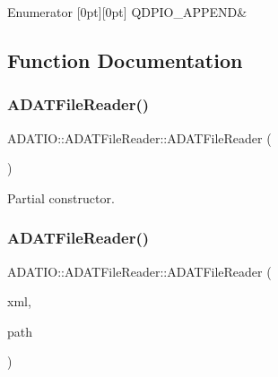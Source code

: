 \begin{DoxyEnumFields}{Enumerator}
[0pt][0pt]{}\mbox{\label{group__qio_gga669520ca9003997be838730beef322b4aae9e16570c37ba9ace5529d3bc48b9a8}} 
Q\+D\+P\+I\+O\+\_\+\+A\+P\+P\+E\+ND&\\
\hline

\end{DoxyEnumFields}


\subsection{Function Documentation}
\mbox{\label{group__qio_ga800c009d1400eb965cc04a7f90bf4f24}} 
\subsubsection{\texorpdfstring{ADATFileReader()}{ADATFileReader()}\hspace{0.1cm}{\footnotesize\ttfamily [1/2]}}
{\footnotesize\ttfamily A\+D\+A\+T\+I\+O\+::\+A\+D\+A\+T\+File\+Reader\+::\+A\+D\+A\+T\+File\+Reader (\begin{DoxyParamCaption}{ }\end{DoxyParamCaption})}



Partial constructor. 

\mbox{\label{group__qio_ga096a7060d69fd109067404e75f8a06ee}} 
\subsubsection{\texorpdfstring{ADATFileReader()}{ADATFileReader()}\hspace{0.1cm}{\footnotesize\ttfamily [2/2]}}
{\footnotesize\ttfamily A\+D\+A\+T\+I\+O\+::\+A\+D\+A\+T\+File\+Reader\+::\+A\+D\+A\+T\+File\+Reader (\begin{DoxyParamCaption}\item[{\mbox{\hyperlink{classADATXML_1_1XMLReader}{X\+M\+L\+Reader}} \&}]{xml,  }\item[{const std\+::string \&}]{path }\end{DoxyParamCaption})}



